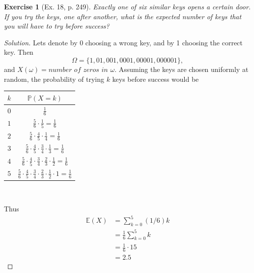 \documentclass[letterpaper, 10 pt, conference]{article}
\newtheorem{ex}{Exercise}
\newcommand\E{\ensuremath{\mathbb{E}}}
\renewcommand{\P}{\ensuremath{\mathbb{P}}}
\newcommand\Om{\ensuremath{\Omega}}
\newcommand{\w}{\ensuremath{\omega}}
\begin{document}
\begin{ex}[Ex. 18, p. 249]
Exactly one of six similar keys opens a certain door. If you try the keys, one after another, what is the expected number of keys that you will have to try before success?
\end{ex}
\begin{proof}[Solution]
Lets denote by 0 choosing a wrong key, and by 1 choosing the correct key. Then 
\begin{equation}
\Om = \lbrace 1, 01, 001, 0001, 00001, 000001 \rbrace,
\end{equation}
and $X(\w) = \textit{number of zeros in } \w$. Assuming the keys are chosen uniformly at random, the probability of trying $k$ keys before success would be

\begin{center} 
\begin{tabular}{|c|c|}
	\hline
	$k$ & $\P(X = k)$ \\
	\hline
	$0$ & $\frac{1}{6}$ \\
	\hline
	$1$ & $\frac{5}{6} \cdot \frac{1}{5} = \frac{1}{6}$ \\
	\hline
	$2$ &  $\frac{5}{6} \cdot \frac{4}{5} \cdot \frac{1}{4} = \frac{1}{6}$ \\
	\hline
	$3$ & $\frac{5}{6} \cdot \frac{4}{5} \cdot \frac{3}{4} \cdot \frac{1}{3} = \frac{1}{6}$ \\
	\hline
	$4$ & $\frac{5}{6} \cdot \frac{4}{5} \cdot \frac{3}{4} \cdot \frac{2}{3} \cdot \frac{1}{2} = \frac{1}{6}$  \\
	\hline
	$5$ & $\frac{5}{6} \cdot \frac{4}{5} \cdot \frac{3}{4} \cdot \frac{2}{3} \cdot \frac{1}{2} \cdot 1 = \frac{1}{6}$ \\
	\hline
\end{tabular}
\
\end{center}

Thus 
\begin{align}
	\E(X) &= \sum_{k = 0}^{5} (1/6) k\\
	&= \frac{1}{6} \sum_{k = 0}^{5} k\\
	&= \frac{1}{6} \cdot 15 \\
	&= 2.5
\end{align}
\end{proof}
\end{document}
